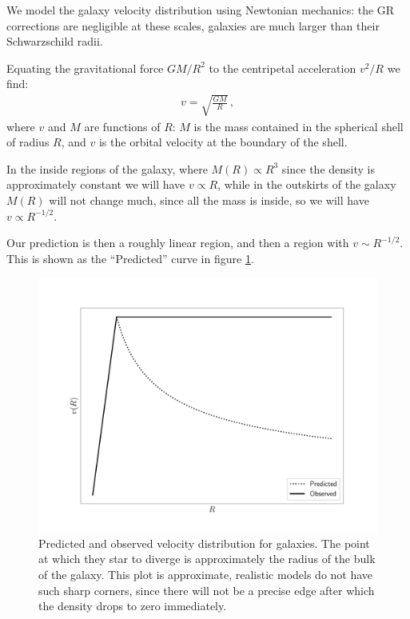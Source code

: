 \documentclass[main.tex]{subfiles}
\begin{document}
We model the galaxy velocity distribution using Newtonian mechanics: the GR corrections are negligible at these scales, galaxies are much larger than their Schwarzschild radii.

Equating the gravitational force \(GM/R^2\) to the centripetal acceleration \(v^2 /R\) we find: 
%
\begin{align}
v = \sqrt{\frac{GM}{R}}
\,,
\end{align}
%
where \(v\) and \(M\) are functions of \(R\): \(M\) is the mass contained in the spherical shell of radius \(R\), and \(v\) is the orbital velocity at the boundary of the shell.

In the inside regions of the galaxy, where \(M(R) \propto R^3\) since the density is approximately constant we will have \(v \propto R\), while in the outskirts of the galaxy \(M(R)\) will not change much, since all the mass is inside, so we will have \(v \propto R^{-1/2}\).

Our prediction is then a roughly linear region, and then a region with \(v \sim R^{-1/2}\).
This is shown as the ``Predicted'' curve in figure \ref{fig:dark_matter}.

\begin{figure}[ht]
\centering
\includegraphics[width=\textwidth]{figures/Dark_matter.pdf}
\caption{Predicted and observed velocity distribution for galaxies. The point at which they star to diverge is approximately the radius of the bulk of the galaxy. This plot is approximate, realistic models do not have such sharp corners, since there will not be a precise edge after which the density drops to zero immediately.}
\label{fig:dark_matter}
\end{figure}  
\end{document}
